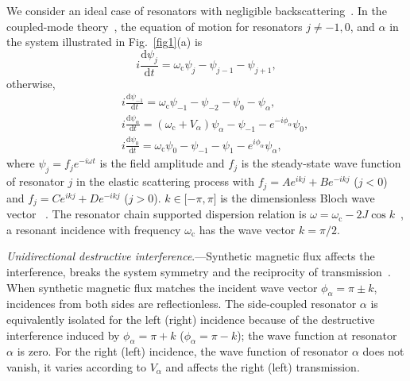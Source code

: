 \documentclass[prl,showpacs,superscriptaddress,twocolumn]{revtex4-1}
\begin{document}
We consider an ideal case of resonators with negligible backscattering~\cite%
{Supplementary}. In the coupled-mode theory~\cite{Haus,Joannopoulos}, the
equation of motion for resonators $j\neq -1,0$, and $\alpha $ in the system
illustrated in Fig.~\ref{fig1}(a) is
\begin{equation}
i\frac{\mathrm{d}\psi _{j}}{\mathrm{d}t}=\omega _{\mathrm{c}}\psi _{j}-\psi
_{j-1}-\psi _{j+1},  \label{1}
\end{equation}%
otherwise,%
\begin{eqnarray}
&&i\frac{\mathrm{d}\psi _{-1}}{\mathrm{d}t}=\omega _{\mathrm{c}}\psi
_{-1}-\psi _{-2}-\psi _{0}-\psi _{\alpha },  \label{2} \\
&&i\frac{\mathrm{d}\psi _{\alpha }}{\mathrm{d}t}=\left( \omega _{\mathrm{c}%
}+V_{\alpha }\right) \psi _{\alpha }-\psi _{-1}-e^{-i\phi _{\alpha }}\psi
_{0},  \label{3} \\
&&i\frac{\mathrm{d}\psi _{0}}{\mathrm{d}t}=\omega _{\mathrm{c}}\psi
_{0}-\psi _{-1}-\psi _{1}-e^{i\phi _{\alpha }}\psi _{\alpha },  \label{4}
\end{eqnarray}%
where $\psi _{j}=f_{j}e^{-i\omega t}$ is the field amplitude and $f_{j}$ is
the steady-state wave function of resonator $j$ in the elastic scattering
process with $f_{j}=Ae^{ikj}+Be^{-ikj}$ ($j<0$) and $f_{j}=Ce^{ikj}+De^{-ikj}
$ ($j>0$). $k\in \lbrack -\pi ,\pi ]$ is the dimensionless Bloch wave vector~%
\cite{MugaPR,PTScattAnnPhys,USS,LonghiOL}. The resonator chain supported
dispersion relation is $\omega =\omega _{\mathrm{c}}-2J\cos k$~\cite%
{USS,Hafezi}, a resonant incidence with frequency $\omega _{\mathrm{c}}$ has
the wave vector $k=\pi /2$.

\emph{Unidirectional destructive interference}.---Synthetic magnetic flux
affects the interference, breaks the system symmetry and the reciprocity of
transmission~\cite{Supplementary}. When synthetic magnetic flux matches the
incident wave vector $\phi _{\alpha }=\pi \pm k$, incidences from both sides
are reflectionless. The side-coupled resonator $\alpha $ is equivalently
isolated for the left (right) incidence because of the destructive
interference induced by $\phi _{\alpha }=\pi +k$ ($\phi _{\alpha }=\pi -k$);
the wave function at resonator $\alpha $ is zero. For the right (left)
incidence, the wave function of resonator $\alpha $ does not vanish, it
varies according to $V_{\alpha }$ and affects the right (left) transmission.
\end{document}
